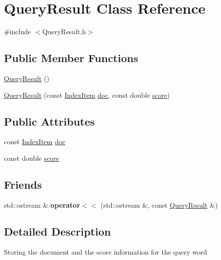 \hypertarget{classQueryResult}{\section{Query\-Result Class Reference}
\label{classQueryResult}
}


{\ttfamily \#include $<$Query\-Result.\-h$>$}

\subsection*{Public Member Functions}
\begin{DoxyCompactItemize}
\item 
\hyperlink{classQueryResult_a23c0f8433d60025e81759f569dc08ab8}{Query\-Result} ()
\item 
\hyperlink{classQueryResult_ae765defee1fe2d3a1361f00d24de6f8b}{Query\-Result} (const \hyperlink{classIndexItem}{Index\-Item} \hyperlink{classQueryResult_ab078a6cc489f8f8f05d7ea97d8514b82}{doc}, const double \hyperlink{classQueryResult_ab76d940559daeac2b7eace3851c9a162}{score})
\end{DoxyCompactItemize}
\subsection*{Public Attributes}
\begin{DoxyCompactItemize}
\item 
const \hyperlink{classIndexItem}{Index\-Item} \hyperlink{classQueryResult_ab078a6cc489f8f8f05d7ea97d8514b82}{doc}
\item 
const double \hyperlink{classQueryResult_ab76d940559daeac2b7eace3851c9a162}{score}
\end{DoxyCompactItemize}
\subsection*{Friends}
\begin{DoxyCompactItemize}
\item 
\hypertarget{classQueryResult_a508480dcd37309a0df1c62221b6a15e3}{std\-::ostream \& {\bfseries operator$<$$<$} (std\-::ostream \&, const \hyperlink{classQueryResult}{Query\-Result} \&)}\label{classQueryResult_a508480dcd37309a0df1c62221b6a15e3}

\end{DoxyCompactItemize}


\subsection{Detailed Description}
Storing the document and the score information for the query word 

